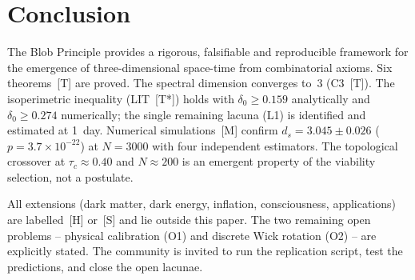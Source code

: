 \documentclass[11pt, a4paper]{article}
\begin{document}
\section{Conclusion}

The Blob Principle provides a rigorous, falsifiable and reproducible
framework for the emergence of three-dimensional space-time from
combinatorial axioms.
Six theorems~[T] are proved.
The spectral dimension converges to~3 (C3~[T]).
The isoperimetric inequality (LIT~[T*]) holds with
$\delta_0\ge0.159$ analytically and $\delta_0\ge0.274$ numerically;
the single remaining lacuna (L1) is identified and estimated at 1~day.
Numerical simulations~[M] confirm $d_s=3.045\pm0.026$
($p=3.7\times10^{-22}$) at $N=3000$ with four independent estimators.
The topological crossover at $\tau_c\approx0.40$ and $N\approx200$
is an emergent property of the viability selection, not a postulate.

All extensions (dark matter, dark energy, inflation, consciousness,
applications) are labelled~[H] or~[S] and lie outside this paper.
The two remaining open problems – physical calibration (O1)
and discrete Wick rotation (O2) – are explicitly stated.
The community is invited to run the replication script,
test the predictions, and close the open lacunae.
\end{document}

